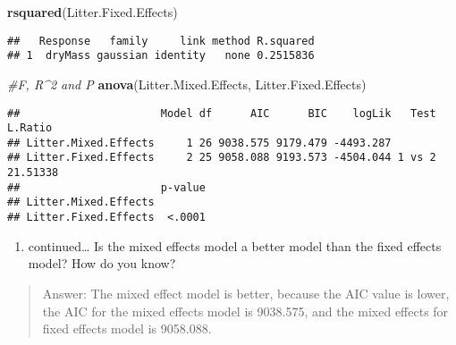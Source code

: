 \documentclass[]{article}
\newenvironment{Shaded}{\begin{snugshade}}{\end{snugshade}}
\newcommand{\CommentTok}[1]{\textcolor[rgb]{0.56,0.35,0.01}{\textit{#1}}}
\newcommand{\KeywordTok}[1]{\textcolor[rgb]{0.13,0.29,0.53}{\textbf{#1}}}
\newcommand{\NormalTok}[1]{#1}
\providecommand{\tightlist}{%
  \setlength{\itemsep}{0pt}\setlength{\parskip}{0pt}}
\begin{document}
\begin{Shaded}
\begin{Highlighting}[]
\KeywordTok{rsquared}\NormalTok{(Litter.Fixed.Effects)}
\end{Highlighting}
\end{Shaded}

\begin{verbatim}
##   Response   family     link method R.squared
## 1  dryMass gaussian identity   none 0.2515836
\end{verbatim}

\begin{Shaded}
\begin{Highlighting}[]
\CommentTok{#F, R^2 and P}
\KeywordTok{anova}\NormalTok{(Litter.Mixed.Effects, Litter.Fixed.Effects)}
\end{Highlighting}
\end{Shaded}

\begin{verbatim}
##                      Model df      AIC      BIC    logLik   Test  L.Ratio
## Litter.Mixed.Effects     1 26 9038.575 9179.479 -4493.287                
## Litter.Fixed.Effects     2 25 9058.088 9193.573 -4504.044 1 vs 2 21.51338
##                      p-value
## Litter.Mixed.Effects        
## Litter.Fixed.Effects  <.0001
\end{verbatim}

\begin{enumerate}
\def\labelenumi{\alph{enumi}.}
\setcounter{enumi}{3}
\tightlist
\item
  continued\ldots{} Is the mixed effects model a better model than the
  fixed effects model? How do you know?
\end{enumerate}

\begin{quote}
Answer: The mixed effect model is better, because the AIC value is
lower, the AIC for the mixed effects model is 9038.575, and the mixed
effects for fixed effects model is 9058.088.
\end{quote}
\end{document}
